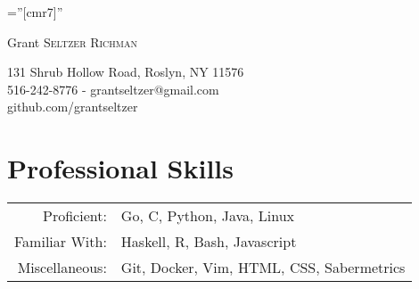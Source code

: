 \documentclass[a4paper,10pt]{article}
\begin{document}

\pagestyle{empty} %

\font\fb=''[cmr7]'' %

\par{\centering
		{\Huge Grant \textsc{Seltzer Richman}
	}\par}

\par{\centering
    {131 Shrub Hollow Road, Roslyn, NY 11576}\\
    {516-242-8776 - grantseltzer@gmail.com}\\
    {github.com/grantseltzer}
\par}

\section{Professional Skills}
\begin{tabular}{rl}
 Proficient:& Go, C, Python, Java, Linux\\
Familiar With:& Haskell, R, Bash, Javascript\\
Miscellaneous:& Git, Docker, Vim, HTML, CSS, Sabermetrics\\
\end{tabular}

\end{document}
